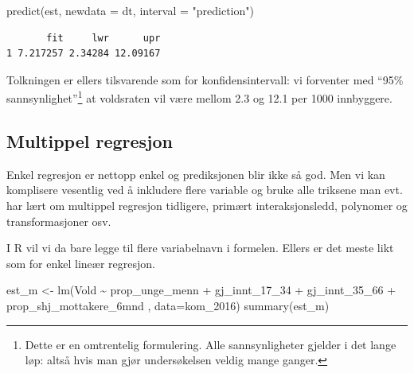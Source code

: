 \documentclass[
  letterpaper,
  DIV=11,
  numbers=noendperiod]{scrreprt}
\newenvironment{Shaded}{\begin{snugshade}}{\end{snugshade}}
\newcommand{\AttributeTok}[1]{\textcolor[rgb]{0.40,0.45,0.13}{#1}}
\newcommand{\FunctionTok}[1]{\textcolor[rgb]{0.28,0.35,0.67}{#1}}
\newcommand{\NormalTok}[1]{\textcolor[rgb]{0.00,0.23,0.31}{#1}}
\newcommand{\OtherTok}[1]{\textcolor[rgb]{0.00,0.23,0.31}{#1}}
\newcommand{\SpecialCharTok}[1]{\textcolor[rgb]{0.37,0.37,0.37}{#1}}
\newcommand{\StringTok}[1]{\textcolor[rgb]{0.13,0.47,0.30}{#1}}
\theoremstyle{definition}
\theoremstyle{remark}
\begin{document}
\begin{Shaded}
\begin{Highlighting}[]
\FunctionTok{predict}\NormalTok{(est, }\AttributeTok{newdata =}\NormalTok{ dt, }\AttributeTok{interval =} \StringTok{"prediction"}\NormalTok{)}
\end{Highlighting}
\end{Shaded}

\begin{verbatim}
       fit     lwr      upr
1 7.217257 2.34284 12.09167
\end{verbatim}

Tolkningen er ellers tilsvarende som for konfidensintervall: vi
forventer med ``95\% sannsynlighet''\footnote{Dette er en omtrentelig
  formulering. Alle sannsynligheter gjelder i det lange løp: altså hvis
  man gjør undersøkelsen veldig mange ganger.} at voldsraten vil være
mellom 2.3 og 12.1 per 1000 innbyggere.

\hypertarget{multippel-regresjon}{%
\subsection{Multippel regresjon}\label{multippel-regresjon}}

Enkel regresjon er nettopp enkel og prediksjonen blir ikke så god. Men
vi kan komplisere vesentlig ved å inkludere flere variable og bruke alle
triksene man evt. har lært om multippel regresjon tidligere, primært
interaksjonsledd, polynomer og transformasjoner osv.

I R vil vi da bare legge til flere variabelnavn i formelen. Ellers er
det meste likt som for enkel lineær regresjon.

\begin{Shaded}
\begin{Highlighting}[]
\NormalTok{est\_m }\OtherTok{\textless{}{-}} \FunctionTok{lm}\NormalTok{(Vold }\SpecialCharTok{\textasciitilde{}}\NormalTok{ prop\_unge\_menn }\SpecialCharTok{+}\NormalTok{ gj\_innt\_17\_34 }\SpecialCharTok{+}\NormalTok{ gj\_innt\_35\_66 }\SpecialCharTok{+} 
\NormalTok{                   prop\_shj\_mottakere\_6mnd , }
            \AttributeTok{data=}\NormalTok{kom\_2016)}
\FunctionTok{summary}\NormalTok{(est\_m)}
\end{Highlighting}
\end{Shaded}
\end{document}
